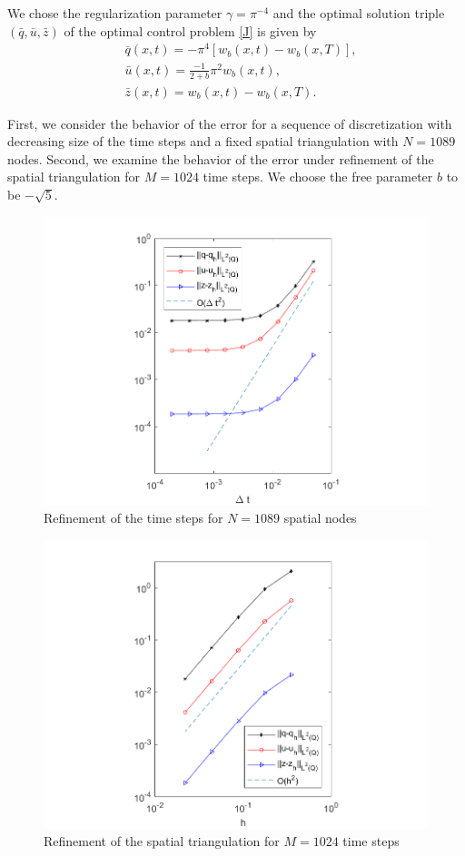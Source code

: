 We chose the regularization parameter $\gamma=\pi^{-4}$ and the optimal solution triple $(\bar{q}, \bar{u}, \bar{z})$ of the optimal control problem \eqref{J} is given by
\begin{align*}
	&\bar{q}(x, t)=-\pi^4\left[w_b(x, t)-w_b(x, T)\right],\\
	&\bar{u}(x, t)=\frac{-1}{2+b}\pi^2w_b(x, t),\\
	&\bar{z}(x, t)=w_b(x, t)-w_b(x, T).
\end{align*}

First, we consider the behavior of the error for a sequence of discretization with decreasing size of the time steps and a fixed spatial triangulation with $N=1089$ nodes. Second, we examine the behavior of the error under refinement of the spatial triangulation for $M=1024$ time steps. We choose the free parameter $b$ to be $-\sqrt{5}$.

\begin{figure}[h!]
	\centering
	\includegraphics[width=\linewidth]{../freefem++/err_t}
	\caption{Refinement of the time steps for $N =1089$ spatial nodes}
\end{figure}

\begin{figure}[h!]
	\centering
	\includegraphics[width=\linewidth]{../freefem++/err_x}
	\caption{Refinement of the spatial triangulation for $M = 1024$ time steps}
\end{figure}
